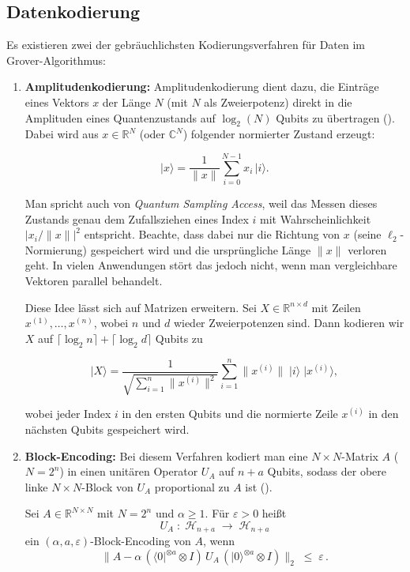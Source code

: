 \subsection{Datenkodierung}
Es existieren zwei der gebräuchlichsten Kodierungsverfahren für Daten im Grover-Algorithmus:  
\begin{enumerate}  
  \item \textbf{Amplitudenkodierung:}  
Amplitudenkodierung dient dazu, die Einträge eines Vektors $x$ der Länge $N$ (mit $N$ als Zweierpotenz) direkt in die Amplituden eines Quantenzustands auf $\log_2(N)$ Qubits zu übertragen (\cite{alessandro_luongo_quantum_2024}). Dabei wird aus $x\in\mathbb{R}^N$ (oder $\mathbb{C}^N$) folgender normierter Zustand erzeugt:

$$
\lvert x\rangle
=\frac{1}{\|x\|}\sum_{i=0}^{N-1}x_i\,\lvert i\rangle.
$$

Man spricht auch von \textit{Quantum Sampling Access}, weil das Messen dieses Zustands genau dem Zufallsziehen eines Index $i$ mit Wahrscheinlichkeit $\lvert x_i/\|x\|\rvert^2$ entspricht. Beachte, dass dabei nur die Richtung von $x$ (seine $\ell_2$-Normierung) gespeichert wird und die ursprüngliche Länge $\|x\|$ verloren geht. In vielen Anwendungen stört das jedoch nicht, wenn man vergleichbare Vektoren parallel behandelt.

Diese Idee lässt sich auf Matrizen erweitern. Sei $X\in\mathbb{R}^{n\times d}$ mit Zeilen\\$x^{(1)},\dots,x^{(n)}$, wobei $n$ und $d$ wieder Zweierpotenzen sind. Dann kodieren wir $X$ auf $\lceil\log_2 n\rceil + \lceil\log_2 d\rceil$ Qubits zu

$$
\lvert X\rangle
=\frac{1}{\sqrt{\sum_{i=1}^n\|x^{(i)}\|^2}}
\sum_{i=1}^n\|x^{(i)}\|\;\lvert i\rangle\;\lvert x^{(i)}\rangle,
$$

wobei jeder Index $i$ in den ersten Qubits und die normierte Zeile $x^{(i)}$ in den nächsten Qubits gespeichert wird.\\

  \item \textbf{Block-Encoding:}  
    Bei diesem Verfahren kodiert man eine \(N\times N\)-Matrix \(A\) (\(N=2^n\)) in einen unitären Operator \(U_A\) auf \(n+a\) Qubits,  
    sodass der obere linke \(N\times N\)-Block von \(U_A\) proportional zu \(A\) ist (\cite{alessandro_luongo_quantum_2024}).

    \begin{definition}\label{def:block-encoding}  
    Sei \(A\in\mathbb{R}^{N\times N}\) mit \(N=2^n\) und \(\alpha\ge1\). Für \(\varepsilon>0\) heißt  
    \[
      U_A\;:\;\mathcal{H}_{n+a}\;\to\;\mathcal{H}_{n+a}
    \]  
    ein \((\alpha,a,\varepsilon)\)\nobreakdash-Block-Encoding von \(A\), wenn  
    \[
      \bigl\|A - \alpha\,(\langle0|^{\otimes a}\otimes I)\,U_A\,(|0\rangle^{\otimes a}\otimes I)\bigr\|_2 \;\le\;\varepsilon\,.  
    \]
    \end{definition}  


\end{enumerate}
